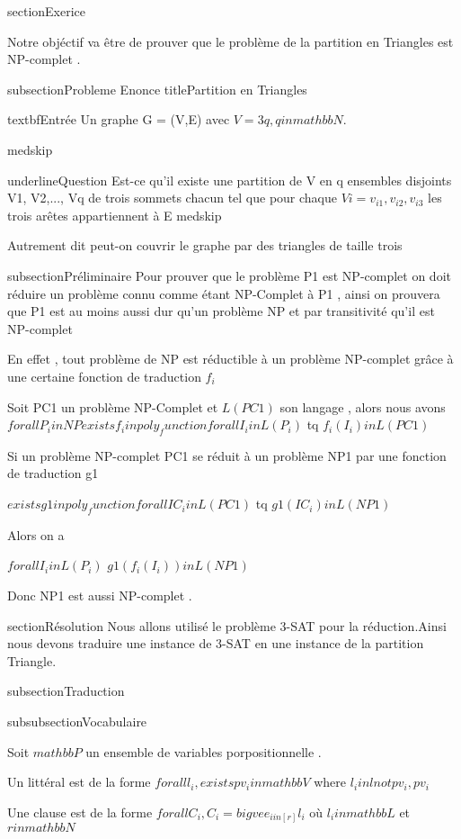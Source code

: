 section{Exerice}


Notre objéctif va être de prouver que le problème de la partition en Triangles est NP-complet .


subsection{Probleme Enonce}
 title{Partition en Triangles}

textbf{Entrée}  Un graphe G = (V,E) avec $V = 3q, q in  mathbb{N}$.

medskip

underline{Question}  Est-ce qu’il existe une partition de V en q ensembles disjoints V1, V2,..., Vq de trois sommets chacun tel que pour chaque $Vi = {v_{i1}, v_{i2} , v_{i3}}$ les trois arêtes appartiennent à E 
medskip

Autrement dit peut-on couvrir le graphe par des triangles de taille trois 


subsection{Préliminaire}
Pour prouver que le problème P1 est NP-complet on doit réduire  un problème connu comme étant NP-Complet à P1 , ainsi on prouvera que P1 est au moins aussi dur qu'un problème NP et par transitivité qu'il est NP-complet

 En effet , tout problème de NP est réductible à un problème NP-complet grâce à une certaine fonction de traduction $f_i$ 

Soit PC1 un problème NP-Complet et $L(PC1)$ son langage , alors nous avons 
$forall P_i in NP exists f_i in poly_function forall I_i in L(P_i)$ tq $f_i(I_i) in L(PC1)$ 

Si un problème NP-complet PC1 se réduit à un problème NP1 par une fonction de traduction g1 

$exists g1 in poly_function forall IC_i in L(PC1)$ tq $g1(IC_i) in L(NP1)$ 

Alors on a 

$forall I_i in L(P_i)$ $g1(f_i(I_i)) in L(NP1)$ 

Donc NP1 est aussi NP-complet .

section{Résolution}
Nous allons utilisé le problème 3-SAT pour la réduction.Ainsi nous devons traduire une instance de 3-SAT en une instance de la partition Triangle.

subsection{Traduction }

subsubsection{Vocabulaire}

Soit $mathbb{P}$ un ensemble de  variables porpositionnelle .

Un littéral est de la forme  $forall l_i, exists pv_i in mathbb{V} $ where $l_i in {lnot pv_i ,pv_i}$ 


Une clause est de la forme  $forall C_i , C_i= bigvee_{i in [r]}l_i $ où  $l_i in mathbb{L} $ et $r in mathbb{N}$

